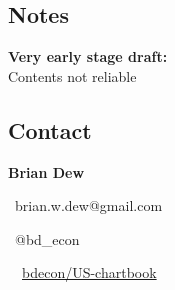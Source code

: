 \documentclass{report}
\begin{document}
\hspace{6mm} \begin{minipage}{0.36\textwidth}
\subsection*{ {\color{red} \faExclamationTriangle} \color{black!70} {\seriffont Notes}}

{\color{red} \textbf{Very early stage draft:}} \\ Contents not reliable \\


\subsection*{{\color{gray} \faUser} \color{black!70} {\seriffont Contact}}

\textbf{Brian Dew} \ 

{\color{gray} \faEnvelope} \ brian.w.dew@gmail.com \ 

{\color{gray} \faTwitter} \ @bd\_econ \

{\color{gray} \faGithub} \ \ \href{https://github.com/bdecon/US-chartbook}{bdecon/US-chartbook}

\vfill
\end{minipage}



\newpage





\end{document}
